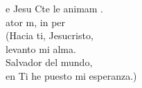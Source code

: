 \begin{cancion}%
	e Jesu Cte le animam .\\
	ator m, in per\\
(Hacia ti, Jesucristo, \\
 levanto mi alma.\\
 Salvador del mundo, \\
 en Ti he puesto mi esperanza.)\\
\end{cancion}%
